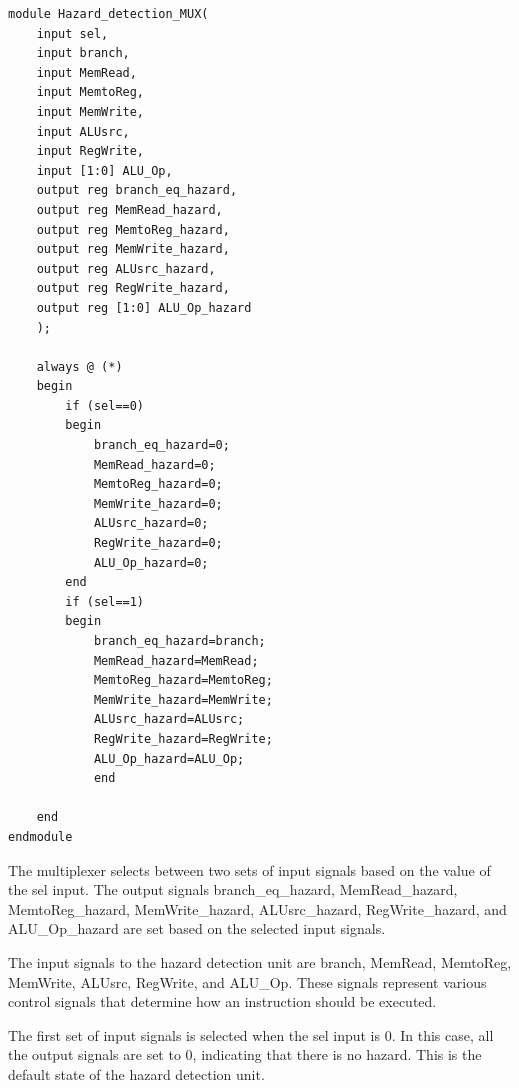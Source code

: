 \documentclass{article}
\begin{document}
\begin{lstlisting}[caption={IF/ID Register}, captionpos=b, language=RISC-V]
module Hazard_detection_MUX(
    input sel,
    input branch,
    input MemRead,
    input MemtoReg,
    input MemWrite,
    input ALUsrc,
    input RegWrite,
    input [1:0] ALU_Op,
    output reg branch_eq_hazard,
    output reg MemRead_hazard,
    output reg MemtoReg_hazard,
    output reg MemWrite_hazard,
    output reg ALUsrc_hazard,
    output reg RegWrite_hazard,
    output reg [1:0] ALU_Op_hazard
    );

    always @ (*)
    begin
        if (sel==0)
        begin
            branch_eq_hazard=0;
            MemRead_hazard=0;
            MemtoReg_hazard=0;
            MemWrite_hazard=0;
            ALUsrc_hazard=0;
            RegWrite_hazard=0;
            ALU_Op_hazard=0;
        end 
        if (sel==1)
        begin
            branch_eq_hazard=branch;
            MemRead_hazard=MemRead;
            MemtoReg_hazard=MemtoReg;
            MemWrite_hazard=MemWrite;
            ALUsrc_hazard=ALUsrc;
            RegWrite_hazard=RegWrite;
            ALU_Op_hazard=ALU_Op;
            end 
        
    end 
endmodule
\end{lstlisting}

The multiplexer selects between two sets of input signals based on the value of the sel input. The output signals branch\_eq\_hazard, MemRead\_hazard, MemtoReg\_hazard, MemWrite\_hazard, ALUsrc\_hazard, RegWrite\_hazard, and ALU\_Op\_hazard are set based on the selected input signals.

The input signals to the hazard detection unit are branch, MemRead, MemtoReg, MemWrite, ALUsrc, RegWrite, and ALU\_Op. These signals represent various control signals that determine how an instruction should be executed.

The first set of input signals is selected when the sel input is 0. In this case, all the output signals are set to 0, indicating that there is no hazard. This is the default state of the hazard detection unit.
\end{document}
